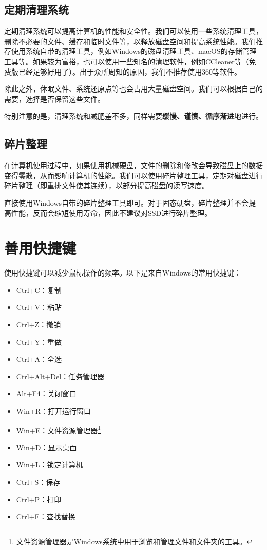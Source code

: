 \documentclass[../main.tex]{subfiles}
\begin{document}
\subsection{定期清理系统}

定期清理系统可以提高计算机的性能和安全性。我们可以使用一些系统清理工具，删除不必要的文件、缓存和临时文件等，以释放磁盘空间和提高系统性能。我们推荐使用系统自带的清理工具，例如Windows的磁盘清理工具、macOS的存储管理工具等。如果较为富裕，也可以使用一些知名的清理软件，例如CCleaner等（免费版已经足够好用了）。出于众所周知的原因，我们不推荐使用360等软件。

除此之外，休眠文件、系统还原点等也会占用大量磁盘空间。我们可以根据自己的需要，选择是否保留这些文件。

特别注意的是，清理系统和减肥差不多，同样需要\textbf{缓慢、谨慎、循序渐进}地进行。

\subsection{碎片整理}

在计算机使用过程中，如果使用机械硬盘，文件的删除和修改会导致磁盘上的数据变得零散，从而影响计算机的性能。我们可以使用碎片整理工具，定期对磁盘进行碎片整理（即重排文件使其连续），以部分提高磁盘的读写速度。

直接使用Windows自带的碎片整理工具即可。对于固态硬盘，碎片整理并不会提高性能，反而会缩短使用寿命，因此不建议对SSD进行碎片整理。

\section{善用快捷键}

使用快捷键可以减少鼠标操作的频率。以下是来自Windows的常用快捷键：
\begin{itemize}
    \item Ctrl+C：复制
    \item Ctrl+V：粘贴
    \item Ctrl+Z：撤销
    \item Ctrl+Y：重做
    \item Ctrl+A：全选
    \item Ctrl+Alt+Del：任务管理器
    \item Alt+F4：关闭窗口
    \item Win+R：打开运行窗口
    \item Win+E：文件资源管理器\footnote{文件资源管理器是Windows系统中用于浏览和管理文件和文件夹的工具。}
    \item Win+D：显示桌面
    \item Win+L：锁定计算机
    \item Ctrl+S：保存
    \item Ctrl+P：打印
    \item Ctrl+F：查找替换
\end{itemize}
\end{document}

